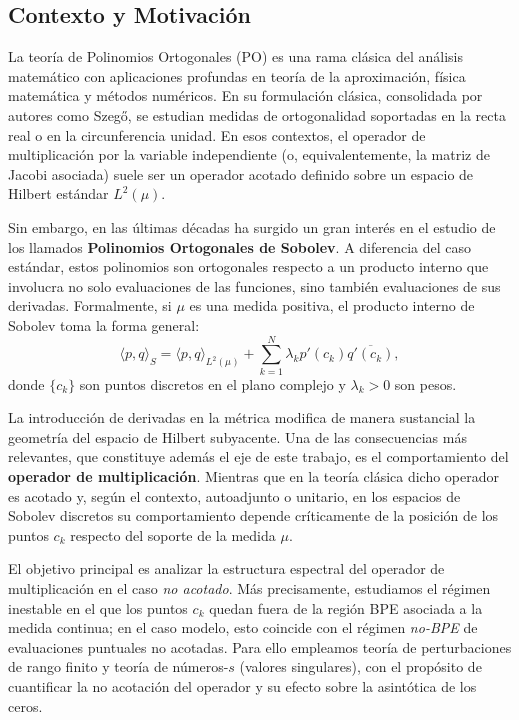 \documentclass[12pt,a4paper]{article}
\theoremstyle{definition}
\theoremstyle{remark}
\begin{document}
\subsection{Contexto y Motivación}

La teoría de Polinomios Ortogonales (PO) es una rama clásica del análisis matemático con aplicaciones profundas en teoría de la aproximación, física matemática y métodos numéricos. En su formulación clásica, consolidada por autores como Szegő, se estudian medidas de ortogonalidad soportadas en la recta real o en la circunferencia unidad. En esos contextos, el operador de multiplicación por la variable independiente (o, equivalentemente, la matriz de Jacobi asociada) suele ser un operador acotado definido sobre un espacio de Hilbert estándar $L^2(\mu)$.

Sin embargo, en las últimas décadas ha surgido un gran interés en el estudio de los llamados \textbf{Polinomios Ortogonales de Sobolev}. A diferencia del caso estándar, estos polinomios son ortogonales respecto a un producto interno que involucra no solo evaluaciones de las funciones, sino también evaluaciones de sus derivadas. Formalmente, si $\mu$ es una medida positiva, el producto interno de Sobolev toma la forma general:
\begin{equation}
  \langle p, q \rangle_S = \langle p, q \rangle_{L^2(\mu)} + \sum_{k=1}^N \lambda_k p'(c_k) \overline{q'(c_k)},
\end{equation}
donde $\{c_k\}$ son puntos discretos en el plano complejo y $\lambda_k > 0$ son pesos.

La introducción de derivadas en la métrica modifica de manera sustancial la geometría del espacio de Hilbert subyacente. Una de las consecuencias más relevantes, que constituye además el eje de este trabajo, es el comportamiento del \textbf{operador de multiplicación}. Mientras que en la teoría clásica dicho operador es acotado y, según el contexto, autoadjunto o unitario, en los espacios de Sobolev discretos su comportamiento depende críticamente de la posición de los puntos $c_k$ respecto del soporte de la medida $\mu$.

El objetivo principal es analizar la estructura espectral del operador de multiplicación en el caso \textit{no acotado}. Más precisamente, estudiamos el régimen inestable en el que los puntos $c_k$ quedan fuera de la región BPE asociada a la medida continua; en el caso modelo, esto coincide con el régimen \textit{no-BPE} de evaluaciones puntuales no acotadas. Para ello empleamos teoría de perturbaciones de rango finito y teoría de números-$s$ (valores singulares), con el propósito de cuantificar la no acotación del operador y su efecto sobre la asintótica de los ceros.
\end{document}

